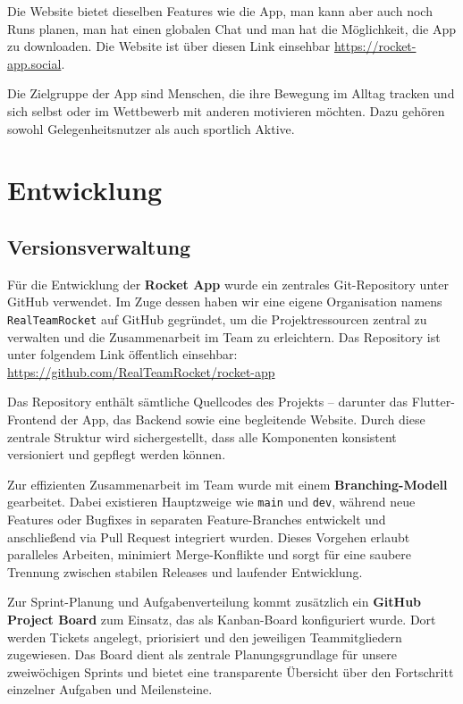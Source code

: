 \documentclass[11pt,a4paper]{article}
\begin{document}
Die Website bietet dieselben Features wie die App, man kann aber auch noch Runs planen, man hat einen globalen Chat und man hat die Möglichkeit, die App zu downloaden.
Die Website ist über diesen Link einsehbar \url{https://rocket-app.social}.

Die Zielgruppe der App sind Menschen, die ihre Bewegung im Alltag tracken und sich selbst oder im Wettbewerb mit anderen motivieren möchten. Dazu gehören sowohl Gelegenheitsnutzer als auch sportlich Aktive.

\section{Entwicklung}
\subsection{Versionsverwaltung}
Für die Entwicklung der \textbf{Rocket App} wurde ein zentrales Git-Repository unter GitHub verwendet. Im Zuge dessen haben wir eine eigene Organisation namens \texttt{RealTeamRocket} auf GitHub gegründet, um die Projektressourcen zentral zu verwalten und die Zusammenarbeit im Team zu erleichtern. Das Repository ist unter folgendem Link öffentlich einsehbar:
\url{https://github.com/RealTeamRocket/rocket-app}

Das Repository enthält sämtliche Quellcodes des Projekts – darunter das Flutter-Frontend der App, das Backend sowie eine begleitende Website. Durch diese zentrale Struktur wird sichergestellt, dass alle Komponenten konsistent versioniert und gepflegt werden können.

Zur effizienten Zusammenarbeit im Team wurde mit einem \textbf{Branching-Modell} gearbeitet. Dabei existieren Hauptzweige wie \texttt{main} und \texttt{dev}, während neue Features oder Bugfixes in separaten Feature-Branches entwickelt und anschließend via Pull Request integriert wurden. Dieses Vorgehen erlaubt paralleles Arbeiten, minimiert Merge-Konflikte und sorgt für eine saubere Trennung zwischen stabilen Releases und laufender Entwicklung.

Zur Sprint-Planung und Aufgabenverteilung kommt zusätzlich ein \textbf{GitHub Project Board} zum Einsatz, das als Kanban-Board konfiguriert wurde. Dort werden Tickets angelegt, priorisiert und den jeweiligen Teammitgliedern zugewiesen. Das Board dient als zentrale Planungsgrundlage für unsere zweiwöchigen Sprints und bietet eine transparente Übersicht über den Fortschritt einzelner Aufgaben und Meilensteine.
\end{document}
